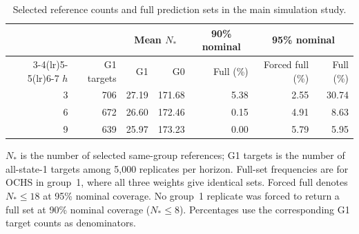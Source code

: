 \begin{table}[!htbp]
\centering
\caption{Selected reference counts and full prediction sets in the
main simulation study.}
\label{tab:reference-availability}
\begingroup
\small
\setlength{\tabcolsep}{5pt}
\renewcommand{\arraystretch}{1.09}
\begin{tabular}{@{}rrrrrrr@{}}
\toprule
& & \multicolumn{2}{c}{Mean $N_*$}
& \multicolumn{1}{c}{90\% nominal}
& \multicolumn{2}{c}{95\% nominal} \\
\cmidrule(lr){3-4}\cmidrule(lr){5-5}\cmidrule(lr){6-7}
$h$ & G1 targets & G1 & G0 & Full (\%)
& Forced full (\%) & Full (\%) \\
\midrule
3 & 706 & 27.19 & 171.68 & 5.38 & 2.55 & 30.74 \\
6 & 672 & 26.60 & 172.46 & 0.15 & 4.91 & 8.63 \\
9 & 639 & 25.97 & 173.23 & 0.00 & 5.79 & 5.95 \\
\bottomrule
\end{tabular}
\par\vspace{5pt}
\begin{minipage}{0.97\linewidth}
\footnotesize
$N_*$ is the number of selected same-group references; G1 targets
is the number of all-state-1 targets among 5,000 replicates per
horizon. Full-set frequencies are for OCHS in group~1, where all
three weights give identical sets. Forced full denotes $N_*\le18$
at 95\% nominal coverage. No group~1 replicate was forced to return
a full set at 90\% nominal coverage ($N_*\le8$). Percentages use
the corresponding G1 target counts as denominators.
\end{minipage}
\endgroup
\end{table}
